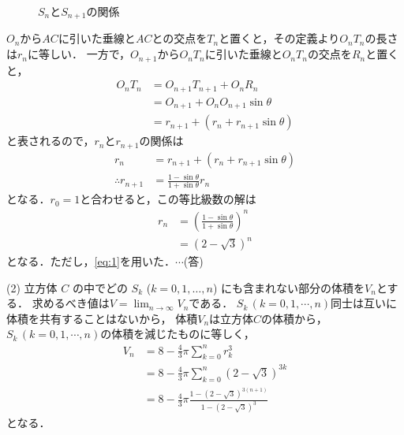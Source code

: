 \documentclass[a4paper,10pt]{ltjsarticle}
\begin{document}
\begin{multicols}{2}
\begin{figure}[H]
        \caption{$S_n$と$S_{n+1}$の関係}
        \label{fig:3}
    \end{figure}

    $O_n$から$AC$に引いた垂線と$AC$との交点を$T_n$と置くと，その定義より$O_nT_n$の長さは$r_n$に等しい．
    一方で，$O_{n+1}$から$O_nT_n$に引いた垂線と$O_nT_n$の交点を$R_n$と置くと，
    \begin{align*}
        O_nT_n
         & =O_{n+1}T_{n+1}+O_nR_n                        \\
         & =O_{n+1}+O_nO_{n+1}\sin\theta                 \\
         & =r_{n+1}+\left(r_{n}+r_{n+1}\sin\theta\right)
    \end{align*}
    と表されるので，$r_n$と$r_{n+1}$の関係は
    \begin{align}
        r_{n}
                & =r_{n+1}+(r_{n}+r_{n+1}\sin\theta)        \\
        \therefore
        r_{n+1} & = \frac{1-\sin\theta}{1+\sin\theta} r_{n}
    \end{align}
    となる．$r_0=1$と合わせると，この等比級数の解は
    \begin{align}
        r_{n}
         & = \left(\frac{1-\sin\theta}{1+\sin\theta}\right)^n \\
         & = (2-\sqrt{3})^n
    \end{align}
    となる．ただし，\cref{eq:1}を用いた．$\cdots$(答)

    \vspace{10pt}
    (2)
    立方体 $C$ の中でどの $S_k$ ($k=0,1,\ldots, n$) にも含まれない部分の体積を$V_n$とする．
    求めるべき値は$\displaystyle V = \lim_{n\to\infty}V_n$である．
    $S_k\, (k=0,1,\cdots,n)$同士は互いに体積を共有することはないから，
    体積$V_n$は立方体$C$の体積から，$S_k\, (k=0,1,\cdots,n)$の体積を減じたものに等しく，
    \begin{align*}
        V_n & = 8 - \frac{4}{3}\pi \sum_{k=0}^{n} r_k^3                             \\
            & = 8 - \frac{4}{3}\pi \sum_{k=0}^{n} (2-\sqrt{3})^{3k}                 \\
            & = 8 - \frac{4}{3}\pi \frac{1-(2-\sqrt{3})^{3(n+1)}}{1-(2-\sqrt{3})^3}
    \end{align*}
    となる．


\end{multicols}
\end{document}
